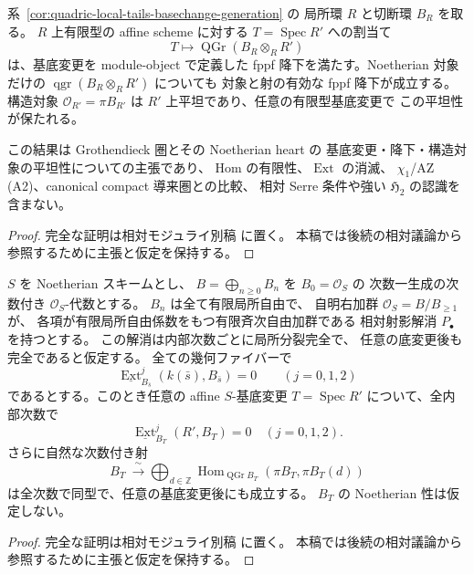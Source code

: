 \begin{corollary}
\label{cor:quadric-local-tails-fppf-descent}
系~\ref{cor:quadric-local-tails-basechange-generation} の
局所環 $R$ と切断環 $B_R$ を取る。
$R$ 上有限型の affine scheme に対する
$T=\operatorname{Spec}R'$ への割当て
\[
   T\longmapsto\operatorname{QGr}(B_R\otimes_RR')
\]
は、基底変更を module-object で定義した
fppf 降下を満たす。Noetherian 対象だけの
$\operatorname{qgr}(B_R\otimes_RR')$ についても
対象と射の有効な fppf 降下が成立する。
構造対象 $\mathcal O_{R'}=\pi B_{R'}$ は
$R'$ 上平坦であり、任意の有限型基底変更で
この平坦性が保たれる。

この結果は Grothendieck 圏とその Noetherian heart の
基底変更・降下・構造対象の平坦性についての主張であり、
Hom の有限性、$\operatorname{Ext}$ の消滅、
$\chi_1$/AZ (A2)、canonical compact 導来圏との比較、
相対 Serre 条件や強い $\mathfrak H_2$ の認識を含まない。
\end{corollary}
\begin{proof}
完全な証明は相対モジュライ別稿
\cite[相対Koszul・Noetherian基底変更・tailsの節]{QuadricModuli2026} に置く。
本稿では後続の相対議論から参照するために主張と仮定を保持する。
\end{proof}


\begin{lemma}
\label{lem:relative-depth-three-saturation}
$S$ を Noetherian スキームとし、
$B=\bigoplus_{n\ge0}B_n$ を $B_0=\mathcal O_S$ の
次数一生成の次数付き $\mathcal O_S$-代数とする。
$B_n$ は全て有限局所自由で、
自明右加群 $\mathcal O_S=B/B_{\ge1}$ が、
各項が有限局所自由係数をもつ有限斉次自由加群である
相対射影解消 $P_\bullet$ を持つとする。
この解消は内部次数ごとに局所分裂完全で、
任意の底変更後も完全であると仮定する。
全ての幾何ファイバーで
\[
  \underline{\operatorname{Ext}}_{B_{\bar s}}^j
        (k(\bar s),B_{\bar s})=0\qquad(j=0,1,2)
  \tag{Depth-3}\label{eq:relative-fibre-depth-three}
\]
であるとする。このとき任意の affine $S$-基底変更
$T=\operatorname{Spec}R'$ について、全内部次数で
\[
 \underline{\operatorname{Ext}}_{B_T}^j(R',B_T)=0
 \quad(j=0,1,2).
 \tag{Rel-depth}\label{eq:relative-depth-three}
\]
さらに自然な次数付き射
\[
B_T\ \xrightarrow{\ \sim\ }
 \bigoplus_{d\in\mathbb Z}
 \operatorname{Hom}_{\operatorname{QGr}B_T}
      (\pi B_T,\pi B_T(d))
 \tag{Saturation}\label{eq:relative-full-saturation}
\]
は全次数で同型で、任意の基底変更後にも成立する。
$B_T$ の Noetherian 性は仮定しない。
\end{lemma}
\begin{proof}
完全な証明は相対モジュライ別稿
\cite[相対Koszul・Noetherian基底変更・tailsの節]{QuadricModuli2026} に置く。
本稿では後続の相対議論から参照するために主張と仮定を保持する。
\end{proof}

